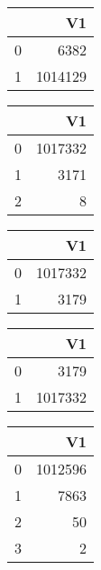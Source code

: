 \bigskip\bigskip
\centering
\begin{tabular}{rr}
  \hline
 & V1 \\ 
  \hline
0 & 6382 \\ 
  1 & 1014129 \\ 
   \hline
\end{tabular}

\bigskip\bigskip
\centering
\begin{tabular}{rr}
  \hline
 & V1 \\ 
  \hline
0 & 1017332 \\ 
  1 & 3171 \\ 
  2 &   8 \\ 
   \hline
\end{tabular}

\bigskip\bigskip
\centering
\begin{tabular}{rr}
  \hline
 & V1 \\ 
  \hline
0 & 1017332 \\ 
  1 & 3179 \\ 
   \hline
\end{tabular}

\bigskip\bigskip
\centering
\begin{tabular}{rr}
  \hline
 & V1 \\ 
  \hline
0 & 3179 \\ 
  1 & 1017332 \\ 
   \hline
\end{tabular}

\bigskip\bigskip
\centering
\begin{tabular}{rr}
  \hline
 & V1 \\ 
  \hline
0 & 1012596 \\ 
  1 & 7863 \\ 
  2 &  50 \\ 
  3 &   2 \\ 
   \hline
\end{tabular}

